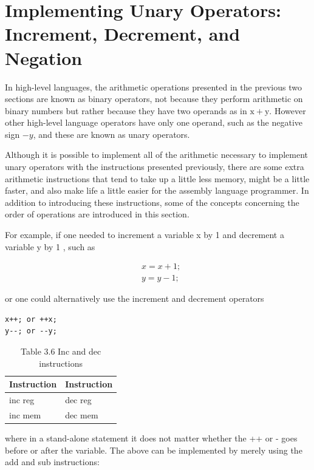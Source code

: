 \documentclass[10pt]{book}
\begin{document}
\section{Implementing Unary Operators: Increment, Decrement, and Negation}
In high-level languages, the arithmetic operations presented in the previous two sections are known as binary operators, not because they perform arithmetic on binary numbers but rather because they have two operands as in $\mathrm{x}+\mathrm{y}$. However other high-level language operators have only one operand, such as the negative sign $-y$, and these are known as unary operators.

Although it is possible to implement all of the arithmetic necessary to implement unary operators with the instructions presented previously, there are some extra arithmetic instructions that tend to take up a little less memory, might be a little faster, and also make life a little easier for the assembly language programmer. In addition to introducing these instructions, some of the concepts concerning the order of operations are introduced in this section.

For example, if one needed to increment a variable x by 1 and decrement a variable y by 1 , such as

$$
\begin{aligned}
& x=x+1 ; \\
& y=y-1 ;
\end{aligned}
$$

or one could alternatively use the increment and decrement operators

\begin{verbatim}
x++; or ++x;
y--; or --y;
\end{verbatim}

\begin{table}[htbp]
\begin{center}
\captionsetup{labelformat=empty}
\caption{Table 3.6 Inc and dec instructions}
\begin{tabular}{|l|l|}
\hline
Instruction & Instruction \\
\hline
inc reg & dec reg \\
\hline
inc mem & dec mem \\
\hline
\end{tabular}
\end{center}
\end{table}

where in a stand-alone statement it does not matter whether the ++ or - goes before or after the variable. The above can be implemented by merely using the add and sub instructions:
\end{document}

